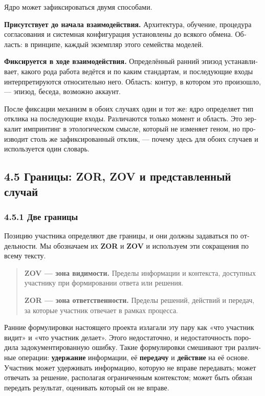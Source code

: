 \begin{russian}
Ядро может зафиксироваться двумя способами.

\textbf{Присутствует до начала взаимодействия.} Архитектура, обучение, процедура согласования и системная конфигурация установлены до всякого обмена. Область: в принципе, каждый экземпляр этого семейства моделей.

\textbf{Фиксируется в ходе взаимодействия.} Определённый ранний эпизод устанавливает, какого рода работа ведётся и по каким стандартам, и последующие входы интерпретируются относительно него. Область: контур, в котором это произошло, — эпизод, беседа, возможно аккаунт.

После фиксации механизм в обоих случаях один и тот же: ядро определяет тип отклика на последующие входы. Различаются только момент и область. Это зеркалит импринтинг в этологическом смысле, который не изменяет геном, но производит столь же зафиксированный отклик, — почему здесь для обоих случаев и используется один словарь.


\subsection*{4.5 Границы: ZOR, ZOV и представленный случай}
\label{sec:ru:4.5}


\subsubsection*{4.5.1 Две границы}
\label{sec:ru:4.5.1}

Позицию участника определяют две границы, и они должны задаваться по отдельности. Мы обозначаем их \textbf{ZOR} и \textbf{ZOV} и используем эти сокращения по всему тексту.

\begin{quote}
\textbf{ZOV — зона видимости.} Пределы информации и контекста, доступных участнику при формировании ответа или решения.

\textbf{ZOR — зона ответственности.} Пределы решений, действий и передач, за которые участник отвечает в рамках процесса.
\end{quote}
Ранние формулировки настоящего проекта излагали эту пару как «что участник видит» и «что участник делает». Этого недостаточно, и недостаточность породила задокументированную ошибку. Такие формулировки смешивают три различные операции: \textbf{удержание} информации, её \textbf{передачу} и \textbf{действие} на её основе. Участник может удерживать информацию, которую не вправе передавать; может отвечать за решение, располагая ограниченным контекстом; может быть обязан передать результат, оценивать который он не вправе.


\end{russian}

